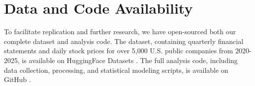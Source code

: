 \documentclass[11pt]{article}
\begin{document}
\section{Data and Code Availability}

To facilitate replication and further research, we have open-sourced both our complete dataset and analysis code. The dataset, containing quarterly financial statements and daily stock prices for over 5,000 U.S. public companies from 2020-2025, is available on HuggingFace Datasets \citep{cash-time-machine-dataset}. The full analysis code, including data collection, processing, and statistical modeling scripts, is available on GitHub \citep{cash-time-machine-code}.

\FloatBarrier



\end{document}
